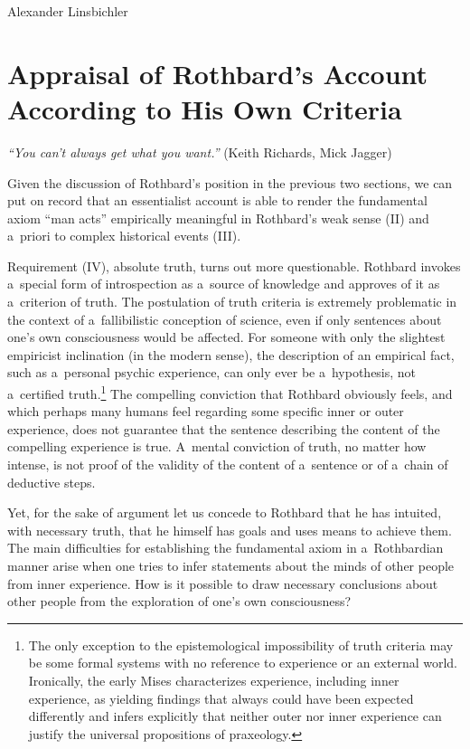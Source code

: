 \begin{artengenv}{Alexander Linsbichler}
\section{Appraisal of Rothbard's Account According to His Own Criteria}


\begin{flushright}
\textit{``You can't always get what you want.''} (Keith Richards, Mick Jagger)
\end{flushright}






Given the discussion of Rothbard's position in the previous two sections, we can put on record that an essentialist account is able to render the fundamental axiom ``man acts'' empirically meaningful in Rothbard's weak sense (II) and a~priori to complex historical events (III).



Requirement (IV), absolute truth, turns out more questionable. Rothbard invokes a~special form of introspection as a~source of knowledge and approves of it as a~criterion of truth. The postulation of truth criteria is extremely problematic in the context of a~fallibilistic conception of science, even if only sentences about one's own consciousness would be affected. For someone with only the slightest empiricist inclination (in the modern sense), the description of an empirical fact, such as a~personal psychic experience, can only ever be a~hypothesis, not a~certified truth.\footnote{The only exception to the epistemological impossibility of truth criteria may be some formal systems with no reference to experience or an external world. Ironically, the early Mises 
\parencite*[][p.18]{mises_nationalokonomie_1940} %
 characterizes experience, including inner experience, as yielding findings that always could have been expected differently and infers explicitly that neither outer nor inner experience can justify the universal propositions of praxeology.} The compelling conviction that Rothbard obviously feels, and which perhaps many humans feel regarding some specific inner or outer experience, does not guarantee that the sentence describing the content of the compelling experience is true. A~mental conviction of truth, no matter how intense, is not proof of the validity of the content of a~sentence or of a~chain of deductive steps.



Yet, for the sake of argument let us concede to Rothbard that he has intuited, with necessary truth, that he himself has goals and uses means to achieve them. The main difficulties for establishing the fundamental axiom in a~Rothbardian manner arise when one tries to infer statements about the minds of other people from inner experience. How is it possible to draw necessary conclusions about other people from the exploration of one's own consciousness?




\end{artengenv}
